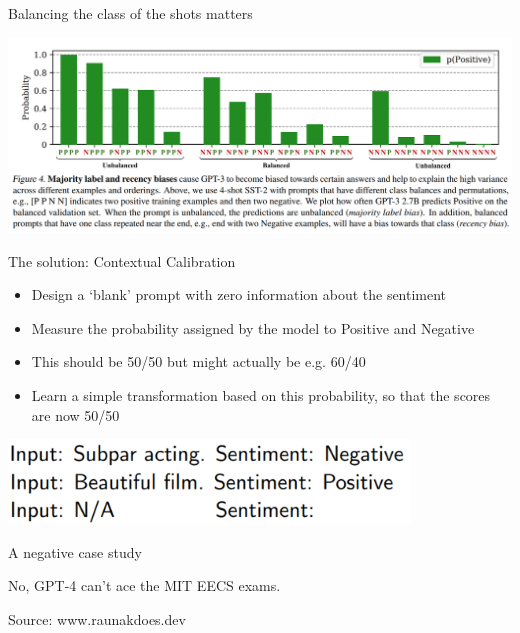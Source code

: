 \begin{vbframe}{Balancing the class of the shots matters}
	\vfill

	\includegraphics[width=\textwidth]{evaluation_figures/shot_balancing.png}
\end{vbframe}	

\begin{vbframe}{The solution: Contextual Calibration}

	\begin{itemize}
		\item Design a `blank' prompt with zero information about the sentiment
		\item Measure the probability assigned by the model to Positive and Negative
		\item This should be 50/50 but might actually be e.g. 60/40
		\item Learn a simple transformation based on this probability, so that the scores are now 50/50
	\end{itemize}
	\vfill
	\includegraphics[width=0.8\textwidth]{evaluation_figures/empty_prompt.png}
\end{vbframe}

\begin{vbframe}{A negative case study}

	No, GPT-4 can't ace the MIT EECS exams.

	\vfill
	\tiny
	Source: www.raunakdoes.dev
\end{vbframe}	

